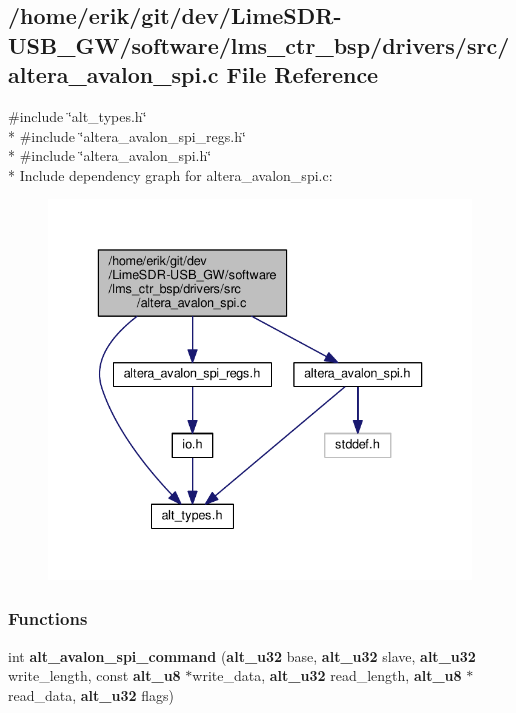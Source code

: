 \subsection{/home/erik/git/dev/\+Lime\+S\+D\+R-\/\+U\+S\+B\+\_\+\+G\+W/software/lms\+\_\+ctr\+\_\+bsp/drivers/src/altera\+\_\+avalon\+\_\+spi.c File Reference}
\label{altera__avalon__spi_8c}
{\ttfamily \#include \char`\"{}alt\+\_\+types.\+h\char`\"{}}\\*
{\ttfamily \#include \char`\"{}altera\+\_\+avalon\+\_\+spi\+\_\+regs.\+h\char`\"{}}\\*
{\ttfamily \#include \char`\"{}altera\+\_\+avalon\+\_\+spi.\+h\char`\"{}}\\*
Include dependency graph for altera\+\_\+avalon\+\_\+spi.\+c\+:
\nopagebreak
\begin{figure}[H]
\begin{center}
\leavevmode
\includegraphics[width=336pt]{d1/d83/altera__avalon__spi_8c__incl}
\end{center}
\end{figure}
\subsubsection*{Functions}
\begin{DoxyCompactItemize}
\item 
int {\bf alt\+\_\+avalon\+\_\+spi\+\_\+command} ({\bf alt\+\_\+u32} base, {\bf alt\+\_\+u32} slave, {\bf alt\+\_\+u32} write\+\_\+length, const {\bf alt\+\_\+u8} $\ast$write\+\_\+data, {\bf alt\+\_\+u32} read\+\_\+length, {\bf alt\+\_\+u8} $\ast$read\+\_\+data, {\bf alt\+\_\+u32} flags)
\end{DoxyCompactItemize}


